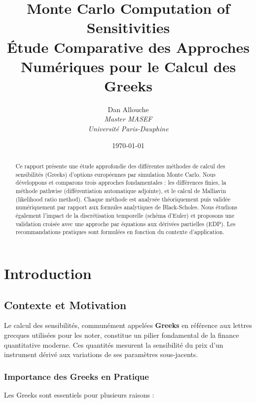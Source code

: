 \documentclass[a4paper,11pt]{article}
\title{\textbf{Monte Carlo Computation of Sensitivities}\\[0.5cm]
\large Étude Comparative des Approches Numériques pour le Calcul des Greeks}
\author{Dan Allouche\\[0.3cm]
\textit{Master MASEF}\\
\textit{Université Paris-Dauphine}}
\date{\today}
\theoremstyle{definition}
\begin{document}
\maketitle

\begin{abstract}
Ce rapport présente une étude approfondie des différentes méthodes de calcul des sensibilités (Greeks) d'options européennes par simulation Monte Carlo. Nous développons et comparons trois approches fondamentales : les différences finies, la méthode pathwise (différentiation automatique adjointe), et le calcul de Malliavin (likelihood ratio method). Chaque méthode est analysée théoriquement puis validée numériquement par rapport aux formules analytiques de Black-Scholes. Nous étudions également l'impact de la discrétisation temporelle (schéma d'Euler) et proposons une validation croisée avec une approche par équations aux dérivées partielles (EDP). Les recommandations pratiques sont formulées en fonction du contexte d'application.
\end{abstract}

\tableofcontents
\newpage

\section{Introduction}

\subsection{Contexte et Motivation}

Le calcul des sensibilités, communément appelées \textbf{Greeks} en référence aux lettres grecques utilisées pour les noter, constitue un pilier fondamental de la finance quantitative moderne. Ces quantités mesurent la sensibilité du prix d'un instrument dérivé aux variations de ses paramètres sous-jacents.

\subsubsection{Importance des Greeks en Pratique}

Les Greeks sont essentiels pour plusieurs raisons :
\end{document}
